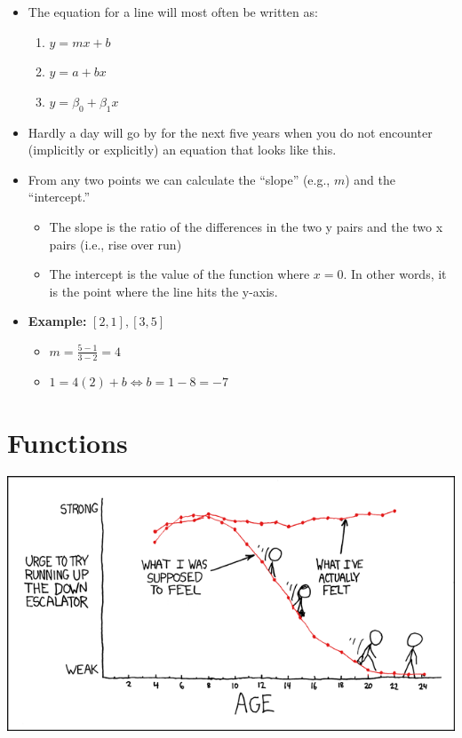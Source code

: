 \documentclass[12pt]{extarticle}
\newcommand{\bi}{\begin{itemize}}
\newcommand{\ei}{\end{itemize}}
\newcommand{\be}{\begin{enumerate}}
\newcommand{\ee}{\end{enumerate}}
\begin{document}
\bi
\item The equation for a line will most often be written as:
\be
\item $y=mx + b$ 
\item $y=a+bx$
\item $y=\beta_0 + \beta_1x$
\ee
\item Hardly a day will go by for the next five years when you do not
  encounter (implicitly or explicitly) an equation that looks like
  this.
\item From any two points we can calculate the ``slope'' (e.g., $m$) and
  the ``intercept.''
\bi
\item The slope is the ratio of the differences in the two y pairs and
  the two x pairs (i.e., rise over run)
\item The intercept is the value of the function where $x=0$.  In
  other words, it is the point where the line hits the y-axis.
\ei
\item\textbf{ Example:} ${[2,1], [3,5]}$
\bi
\item$ m = \frac{5-1}{3-2}=4$
\item $1 = 4(2) + b \iff b=1-8=-7$
\ei 
\ei


\section{Functions}
\begin{centering}
\includegraphics[width=6in]{escalators}
\end{centering}
\end{document}
